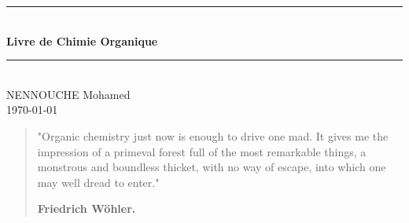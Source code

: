 \documentclass[a4paper, oneside]{book}
\begin{document}
\large
\frontmatter
\begin{titlepage}
\newcommand{\HRule}{\rule{\linewidth}{0.5mm}}
\center
\vspace*{5cm}
\HRule \\[0.4cm]
{ \huge \bfseries Livre de Chimie Organique\\[0.15cm]}
\HRule \\[1.5cm]

\large
NENNOUCHE Mohamed\\[1cm]
\today\\
\end{titlepage}
\newpage
{}
\begin{quotation}
\LARGE{"Organic chemistry just now is enough to drive one mad. It gives me the impression of a primeval forest full of the most remarkable things, a monstrous and boundless thicket, with no way of escape, into which one may well dread to enter."\\
\begin{center}
    \textbf{Friedrich Wöhler.}
\end{center}}
\end{quotation}
\newpage
\vspace*{\fill}
\end{document}
